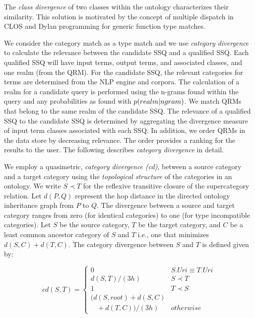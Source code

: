 The \emph{class divergence} of two classes within the ontology characterizes their similarity.  This solution is motivated by the concept of multiple dispatch in CLOS and Dylan programming for generic function type matches. 

We consider the category match as a type match and we use \emph{category divergence} to calculate the relevance between the candidate SSQ and a qualified SSQ. Each qualified SSQ will have input terms, output terms, and associated classes, and one realm (from the QRM). 
For the candidate SSQ, the relevant categories for terms are determined from the NLP engine and corpora. The calculation of a realm for a candidate query is performed using the n-grams found within the query and any probabilities as found with $p(realm|n\-gram)$. %
We match QRMs that belong to the same realm of the candidate SSQ. The relevance of a qualified SSQ to the candidate SSQ is determined by aggregating the divergence measure of input term classes associated with each SSQ. In addition, we order QRMs in the data store 
by decreasing relevance. The order provides a ranking for the results 
to the user. The following describes \emph{category divergence} 
in detail.


We employ a quasimetric, \textit{category
divergence (cd)},
between a source category and a target category using the \textit{topological
structure} of the categories in an ontology. We write $S \prec T$ for the
reflexive
transitive closure of the supercategory relation. Let $d(P,Q)$ represent the hop
distance in the directed ontology inheritance graph from $P$ to $Q$. The
divergence between a source and target category ranges from zero (for identical
categories) to one (for type incompatible categories). Let $S$ be the source
category, $T$ be
the target category, and $C$ be a least common ancestor category of $S$ and
$T$ i.e., one that minimizes $d(S,C) + d(T,C)$. The category divergence between $S$ and $T$ is defined given by:

\begin{equation}
cd(S, T) = \begin{cases}
0 & S.{Uri} \equiv T.{Uri}\\
d(S, T)/(3h) & S \prec T\\
1 & T \prec S\\
(d(S,root) + d(S,C) \\ \ \ \ \ + d(T,C))/(3h) & otherwise
\end{cases}
\end{equation}

